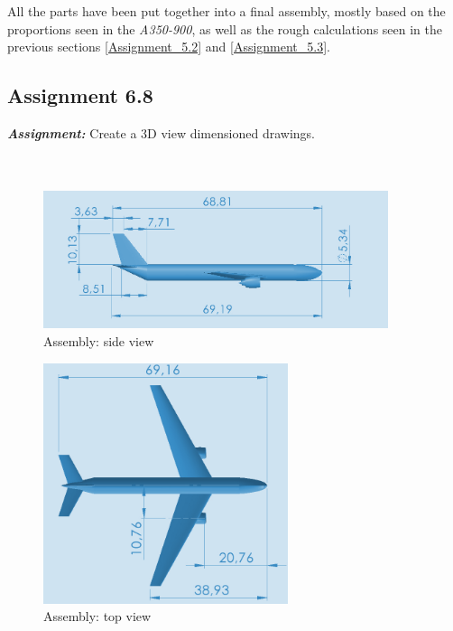 \documentclass{article}
\begin{document}
All the parts have been put together into a final assembly, mostly based on the proportions seen 
in the \textit{A350-900}, as well as the rough calculations seen in the previous sections \ref{Assignment_5.2} and \ref{Assignment_5.3}. \\ 



\clearpage

\subsection{Assignment 6.8\label{Assignment_6.8}}

\textbf{\textit{Assignment:}} Create a 3D view dimensioned drawings. \\ \\ \\ 

\begin{figure}[h!]
    \centering
    \includegraphics[width=0.9\textwidth]{Sources/Plots_and_Pictures/Assembly_side.png}
    \caption{Assembly: side view}
    \label{Assembly_side}
\end{figure}

\begin{figure}[h!]
    \centering
    \includegraphics[width=0.64\textwidth]{Sources/Plots_and_Pictures/Assembly_up.png}
    \caption{Assembly: top view}
    \label{Assembly_up}
\end{figure}
\end{document}
